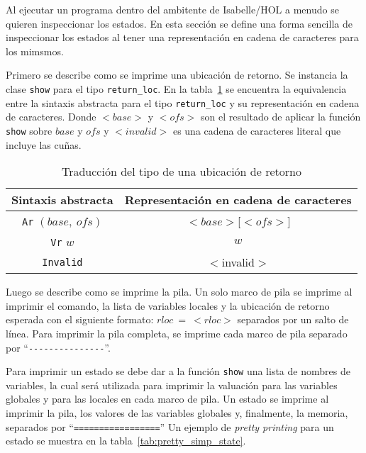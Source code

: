 Al ejecutar un programa dentro del ambitente de Isabelle/HOL a menudo se quieren inspeccionar los estados.
En esta sección se define una forma sencilla de inspeccionar los estados al tener una representación en cadena de caracteres para los mimsmos.

Primero se describe como se imprime una ubicación de retorno.
Se instancia la clase \verb|show| para el tipo \verb|return_loc|.
En la tabla~\ref{tab:pretty_rloc} se encuentra la equivalencia entre la sintaxis abstracta para el tipo \verb|return_loc| y su representación en cadena de caracteres.
Donde $<base>$ y $<ofs>$ son el resultado de aplicar la función \verb|show| sobre $base$ y $ofs$ y $<invalid>$ es una cadena de caracteres literal que incluye las cuñas.

\begin{table}[h!]
\centering
\begin{tabular}{|c|c|}
  \hline
  \textbf{Sintaxis abstracta} & \textbf{Representación en cadena de caracteres} \\ [0.5ex]
  \hline \hline
  \verb|Ar| $(base,\ ofs)$ & $<base>$[$<ofs>$] \\
  \verb|Vr| $w$ & $w$ \\
  \verb|Invalid| & $<$invalid$>$ \\
  \hline
\end{tabular}

\caption{Traducción del tipo de una ubicación de retorno}
\label{tab:pretty_rloc}
\end{table}

Luego se describe como se imprime la pila.
Un solo marco de pila se imprime al imprimir el comando, la lista de variables locales y la ubicación de retorno esperada con el siguiente formato: $rloc\ =\ <rloc>$ separados por un salto de línea.
Para imprimir la pila completa, se imprime cada marco de pila separado por ``\verb|---------------|''.


Para imprimir un estado se debe dar a la función \verb|show| una lista de nombres de variables, la cual será utilizada para imprimir la valuación para las variables globales y para las locales en cada marco de pila.
Un estado se imprime al imprimir la pila, los valores de las variables globales y, finalmente, la memoria, separados por ``\verb|=================|''
Un ejemplo de \textit{pretty printing} para un estado se muestra en la tabla~\ref{tab:pretty_simp_state}.

